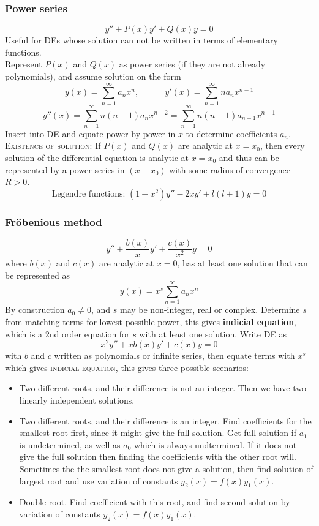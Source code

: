 \documentclass[a4paper, 10pt]{article}
\begin{document}
\begin{multicols*}{3}
\subsubsection*{\small Power series}
$$ y'' + P(x)y' + Q(x)y = 0$$
Useful for DEs whose solution can not be written in terms of elementary functions. \\
Represent $P(x)$ and $Q(x)$ as power series (if they are not already polynomials), and assume solution on the form
$$ y(x) = \sum_{n=1}^{\infty} a_n x^n, \qquad \quad y'(x) = \sum_{n=1}^{\infty} na_n x^{n-1}$$ $$y''(x) = \sum_{n=1}^{\infty} n(n-1)a_n x^{n-2} = \sum_{n=1}^{\infty} n(n+1)a_{n+1} x^{n-1}$$
Insert into DE and equate power by power in $x$ to determine coefficients $a_n$.\\
\textsc{Existence of solution:} If $P(x)$ and $Q(x)$ are analytic at $x=x_0$, then every solution of the differential equation is analytic at $x=x_0$ and thus can be represented by a power series in $(x-x_0)$ with some radius of convergence $R>0$.
$$ \text{Legendre functions: } (1-x^2)y'' -2xy' + l(l+1)y = 0$$


\subsubsection*{\small Fröbenious method}
$$y'' + \frac{b(x)}{x}y' + \frac{c(x)}{x^2}y = 0 $$
where $b(x)$ and $c(x)$ are analytic at $x=0$, has at least one solution that can be represented as
$$y(x) = x^s \sum_{n=1}^{\infty} a_n x^n$$
By construction $a_0 \neq 0$, and $s$ may be non-integer, real or complex.
Determine $s$ from matching terms for lowest possible power, this gives \textbf{indicial equation}, which is a 2nd order equation for $s$ with at least one solution. Write DE as
$$ x^2y'' + xb(x)y' + c(x)y = 0$$
with $b$ and $c$ written as polynomials or infinite series, then equate terms with $x^s$ which gives \textsc{indicial equation}, this gives three possible scenarios:
\begin{itemize}
  \item Two different roots, and their difference is not an integer. Then we have two linearly independent solutions.
  \item Two different roots, and their difference is an integer. Find coefficients for the smallest root first, since it might give the full solution. Get full solution if $a_1$ is undetermined, as well as $a_0$ which is always undtermined. If it does not give the full solution then finding the coefficients with the other root will. Sometimes the the smallest root does not give a solution, then find solution of largest root and use variation of constants $y_2(x) = f(x)y_1(x)$.
  \item Double root. Find coefficient with this root, and find second solution by variation of constants $y_2(x) = f(x)y_1(x)$.
\end{itemize}


\end{multicols*}
\end{document}
